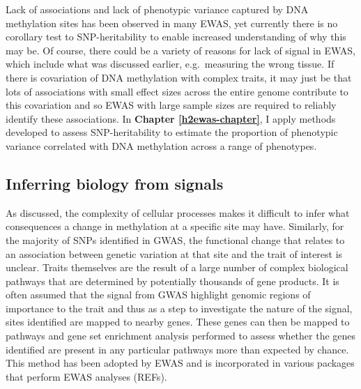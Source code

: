 \documentclass[11pt,twoside]{bristolthesis}
\begin{document}
Lack of associations and lack of phenotypic variance captured by DNA methylation sites has been observed in many EWAS, yet currently there is no corollary test to SNP-heritability to enable increased understanding of why this may be. Of course, there could be a variety of reasons for lack of signal in EWAS, which include what was discussed earlier, e.g.~measuring the wrong tissue. If there is covariation of DNA methylation with complex traits, it may just be that lots of associations with small effect sizes across the entire genome contribute to this covariation and so EWAS with large sample sizes are required to reliably identify these associations. In \textbf{Chapter \ref{h2ewas-chapter}}, I apply methods developed to assess SNP-heritability to estimate the proportion of phenotypic variance correlated with DNA methylation across a range of phenotypes.

\hypertarget{inferring-biology-from-signals}{%
\subsection{Inferring biology from signals}\label{inferring-biology-from-signals}}

As discussed, the complexity of cellular processes makes it difficult to infer what consequences a change in methylation at a specific site may have. Similarly, for the majority of SNPs identified in GWAS, the functional change that relates to an association between genetic variation at that site and the trait of interest is unclear. Traits themselves are the result of a large number of complex biological pathways that are determined by potentially thousands of gene products. It is often assumed that the signal from GWAS highlight genomic regions of importance to the trait and thus as a step to investigate the nature of the signal, sites identified are mapped to nearby genes. These genes can then be mapped to pathways and gene set enrichment analysis performed to assess whether the genes identified are present in any particular pathways more than expected by chance. This method has been adopted by EWAS and is incorporated in various packages that perform EWAS analyses (REFs).
\end{document}
